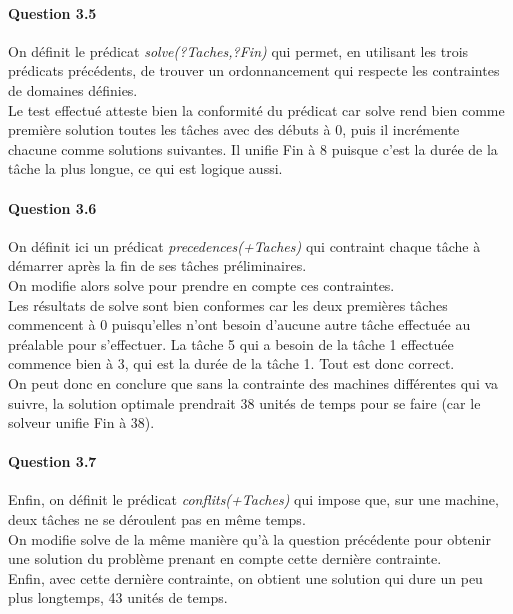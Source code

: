 \documentclass[11pt]{article} %
\begin{document}
\paragraph{Question 3.5}
On définit le prédicat \textit{solve(?Taches,?Fin)} qui permet, en utilisant les trois prédicats précédents, de trouver un ordonnancement qui respecte les contraintes de domaines définies.\\
Le test effectué atteste bien la conformité du prédicat car solve rend bien comme première solution toutes les tâches avec des débuts à 0, puis il incrémente chacune comme solutions suivantes. Il unifie Fin à 8 puisque c'est la durée de la tâche la plus longue, ce qui est logique aussi.


\paragraph{Question 3.6}
On définit ici un prédicat \textit{precedences(+Taches)} qui contraint chaque tâche à démarrer après la fin de ses tâches préliminaires.\\ On modifie alors solve pour prendre en compte ces contraintes.\\ Les résultats de solve sont bien conformes car les deux premières tâches commencent à 0 puisqu'elles n'ont besoin d'aucune autre tâche effectuée au préalable pour s'effectuer. La tâche 5 qui a besoin de la tâche 1 effectuée commence bien à 3, qui est la durée de la tâche 1. Tout est donc correct.\\ On peut donc en conclure que sans la contrainte des machines différentes qui va suivre, la solution optimale prendrait 38 unités de temps pour se faire (car le solveur unifie Fin à 38).


\paragraph{Question 3.7}
Enfin, on définit le prédicat \textit{conflits(+Taches)} qui impose que, sur une machine, deux tâches ne se déroulent pas en même temps.\\ On modifie solve de la même manière qu'à la question précédente pour obtenir une solution du problème prenant en compte cette dernière contrainte.\\ Enfin, avec cette dernière contrainte, on obtient une solution qui dure un peu plus longtemps, 43 unités de temps.

\end{document}

